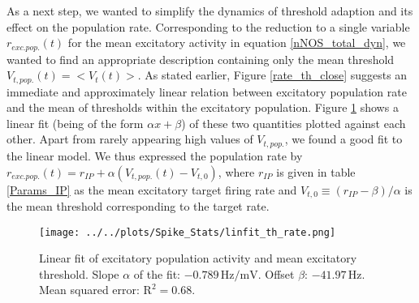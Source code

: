 \documentclass[10pt,a4paper]{article}
\begin{document}
As a next step, we wanted to simplify the dynamics of threshold adaption and its effect on the population rate. Corresponding to the reduction to a single variable $r_{exc.pop.}(t)$ for the mean excitatory activity in equation \eqref{nNOS_total_dyn}, we wanted to find an appropriate description containing only the mean threshold $V_{t,pop.}(t) = <V_t(t)>$. As stated earlier, Figure \ref{rate_th_close} suggests an immediate and approximately linear relation between excitatory population rate and the mean of thresholds within the excitatory population. Figure \ref{thresh_r_linfit} shows a linear fit (being of the form $\alpha x + \beta$) of these two quantities plotted against each other. Apart from rarely appearing high values of $V_{t,pop.}$, we found a good fit to the linear model. We thus expressed the population rate by $r_{exc.pop.}(t) = r_{IP} + \alpha(V_{t,pop.}(t)-V_{t,0})$, where $r_{IP}$ is given in table \ref{Params_IP} as the mean excitatory target firing rate and $V_{t,0} \equiv (r_{IP}-\beta)/\alpha$ is the mean threshold corresponding to the target rate.
\begin{figure}
\texttt{[image: ../../plots/Spike\_Stats/linfit\_th\_rate.png]}
\caption{Linear fit of excitatory population activity and mean excitatory threshold. Slope $\alpha$ of the fit: $\mathrm{-0.789\, Hz/mV}$. Offset $\beta$: $\mathrm{-41.97\, Hz}$. Mean squared error: $\mathrm{R^2 = 0.68}$.}
\label{thresh_r_linfit}
\end{figure}
\end{document}
